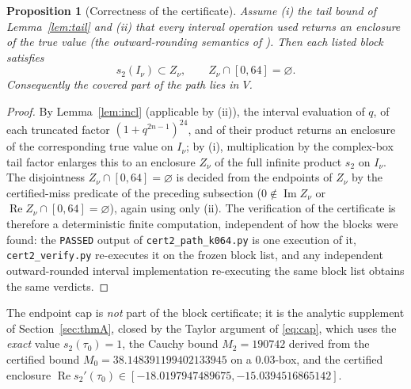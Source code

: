 \documentclass[11pt]{article}
\newtheorem{proposition}[theorem]{Proposition}
\theoremstyle{definition}
\theoremstyle{remark}
\newcommand{\ImT}{\operatorname{Im}}
\newcommand{\ReT}{\operatorname{Re}}
\begin{document}
\begin{proposition}[Correctness of the certificate]\label{prop:cert}
Assume \textup{(i)} the tail bound of Lemma~\ref{lem:tail} and
\textup{(ii)} that every interval operation used returns an enclosure of
the true value \textup{(}the outward-rounding semantics of
\textup{\cite{ivdoc})}. Then each listed block satisfies
\[
  s_2(I_\nu)\subset Z_\nu,
  \qquad Z_\nu\cap[0,64]=\varnothing .
\]
Consequently the covered part of the path lies in $V$.
\end{proposition}
\begin{proof}
By Lemma~\ref{lem:incl} (applicable by (ii)), the interval evaluation of
$q$, of each truncated factor $(1+q^{2n-1})^{24}$, and of their product
returns an enclosure of the corresponding true value on $I_\nu$; by (i),
multiplication by the complex-box tail factor enlarges this to an
enclosure $Z_\nu$ of the full infinite product $s_2$ on $I_\nu$. The disjointness
$Z_\nu\cap[0,64]=\varnothing$ is decided from the endpoints of $Z_\nu$ by
the certified-miss predicate of the preceding subsection
($0\notin\ImT Z_\nu$ or $\ReT Z_\nu\cap[0,64]=\varnothing$), again using
only (ii). The verification of the certificate is therefore a
deterministic finite computation, independent of how the blocks were
found: the \texttt{PASSED} output of \texttt{cert2\_path\_k064.py} is one
execution of it, \texttt{cert2\_verify.py} re-executes it on the frozen
block list, and any independent outward-rounded interval
implementation re-executing the same block list obtains the same
verdicts.
\end{proof}

The endpoint cap is \emph{not} part of the block certificate; it is the
analytic supplement of Section~\ref{sec:thmA}, closed by the Taylor
argument of \eqref{eq:cap}, which uses the \emph{exact} value
$s_2(\tau_0)=1$, the Cauchy bound $M_2=190742$ derived from the certified
bound $M_0=38.148391199402133945$ on a $0.03$-box, and the certified
enclosure $\ReT s_2'(\tau_0)\in[-18.0197947489675,-15.0394516865142]$.
\end{document}
